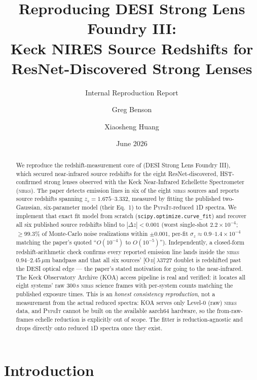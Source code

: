 \documentclass[11pt,letterpaper]{article}
\title{Reproducing DESI Strong Lens Foundry III:\\
       Keck NIRES Source Redshifts for ResNet-Discovered Strong Lenses}
\author{Greg Benson \and Xiaosheng Huang}
\date{June 2026}
\newcommand{\zs}{\ensuremath{z_s}}
\newcommand{\dz}{\ensuremath{\Delta z}}
\newcommand{\micron}{\ensuremath{\,\mu\mathrm{m}}}
\newcommand{\NIRES}{\textsc{nires}}
\begin{document}
\maketitle
\subtitle{Internal Reproduction Report}

\begin{abstract}
We reproduce the redshift-measurement core of
\citet{agarwal2025foundry3} (DESI Strong Lens Foundry III), which secured
near-infrared source redshifts for the eight ResNet-discovered,
HST-confirmed strong lenses observed with the Keck Near-Infrared
Echellette Spectrometer (\NIRES). The paper detects emission lines in six
of the eight \NIRES{} sources and reports source redshifts spanning
$\zs = 1.675$--$3.332$, measured by fitting the published two-Gaussian,
six-parameter model (their Eq.~1) to the \textsc{PypeIt}-reduced 1D
spectra. We implement that exact fit model from scratch
(\texttt{scipy.optimize.curve\_fit}) and recover all six published source
redshifts blind to $|\dz| < 0.001$ (worst single-shot $2.2\times10^{-4}$;
$\geq99.3\%$ of Monte-Carlo noise realizations within $\pm0.001$, per-fit
$\sigma_z \approx 0.9$--$1.4\times10^{-4}$ matching the paper's quoted
``$O(10^{-4})$ to $O(10^{-5})$''). Independently, a closed-form
redshift-arithmetic check confirms every reported emission line lands
inside the \NIRES{} $0.94$--$2.45\micron$ bandpass and that all six
sources' [O\,\textsc{ii}]\,$\lambda3727$ doublet is redshifted past the
DESI optical edge --- the paper's stated motivation for going to the
near-infrared. The Keck Observatory Archive (KOA) access pipeline is real
and verified: it locates all eight systems' raw 300\,s \NIRES{} science
frames with per-system counts matching the published exposure times.
This is an \emph{honest consistency reproduction}, not a measurement from
the actual reduced spectra: KOA serves only Level-0 (raw) \NIRES{} data,
and \textsc{PypeIt} cannot be built on the available aarch64 hardware, so
the from-raw-frames echelle reduction is explicitly out of scope. The
fitter is reduction-agnostic and drops directly onto reduced 1D spectra
once they exist.
\end{abstract}

\tableofcontents

\bigskip

\section{Introduction}
\end{document}
